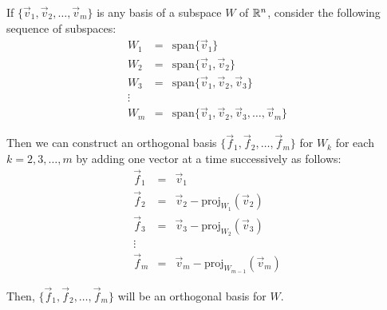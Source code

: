 \documentclass{ximera}
\begin{document}
\begin{theorem} \label{th:GS}
If $\{\vec{v}_{1}, \vec{v}_{2}, \dots , \vec{v}_{m}\}$ is any basis of a subspace $W$ of $\mathbb{R}^n$, consider the following sequence of subspaces:
\begin{equation*}
\begin{array}{ccl}
W_1&=&\mbox{span}\{\vec{v}_{1}\} \\
W_2&=&\mbox{span}\{\vec{v}_{1},\vec{v}_{2}\} \\
W_3&=&\mbox{span}\{\vec{v}_{1},\vec{v}_{2},\vec{v}_{3}\} \\
\vdots &&\\
W_m &=& \mbox{span}\{\vec{v}_{1},\vec{v}_{2},\vec{v}_{3},\ldots,\vec{v}_{m}\}
\end{array}
\end{equation*}

Then we can construct an orthogonal basis $\{\vec{f}_{1},\vec{f}_{2},\ldots,\vec{f}_{m}\}$ for $W_k$ for each $k = 2, 3, \dots , m$ by adding one vector at a time successively as follows:
\begin{equation*}
\begin{array}{ccl}
\vec{f}_{1} &=& \vec{v}_{1} \\
\vec{f}_{2} &=& \vec{v}_{2} - \mbox{proj}_{W_1}(\vec{v}_2) \\
\vec{f}_{3} &=& \vec{v}_{3} - \mbox{proj}_{W_2}(\vec{v}_3) \\
\vdots &&\\
\vec{f}_{m} &=& \vec{v}_{m} - \mbox{proj}_{W_{m-1}}(\vec{v}_m)
\end{array}
\end{equation*}

Then, $\{\vec{f}_{1},\vec{f}_{2},\ldots,\vec{f}_{m}\}$ will be an orthogonal basis for $W$.  
\end{theorem}
\end{document}
